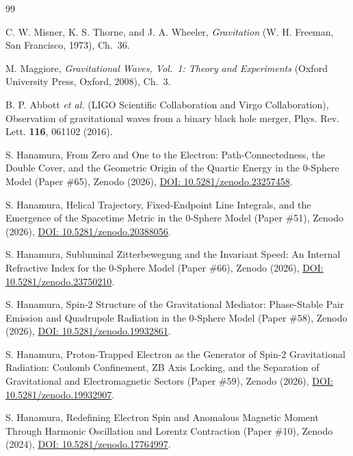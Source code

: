 \documentclass[%
 reprint, amsmath,amssymb, aps, prb, ]{revtex4-2}
\numberwithin{equation}{section}
\begin{document}
\begin{thebibliography}{99}

 C. W. Misner, K. S. Thorne, and J. A. Wheeler, \textit{Gravitation} (W. H. Freeman, San Francisco, 1973), Ch.~36.

 M. Maggiore, \textit{Gravitational Waves, Vol.~1: Theory and Experiments} (Oxford University Press, Oxford, 2008), Ch.~3.

 B. P. Abbott \textit{et al.} (LIGO Scientific Collaboration and Virgo Collaboration), Observation of gravitational waves from a binary black hole merger, Phys. Rev. Lett. \textbf{116}, 061102 (2016).

 S. Hanamura, From Zero and One to the Electron: Path-Connectedness, the Double Cover, and the Geometric Origin of the Quartic Energy in the 0-Sphere Model (Paper \#65), Zenodo (2026), \href{https://doi.org/10.5281/zenodo.23257458}{DOI: 10.5281/zenodo.23257458}.

 S. Hanamura, Helical Trajectory, Fixed-Endpoint Line Integrals, and the Emergence of the Spacetime Metric in the 0-Sphere Model (Paper \#51), Zenodo (2026), \href{https://doi.org/10.5281/zenodo.20388056}{DOI: 10.5281/zenodo.20388056}.

 S. Hanamura, Subluminal Zitterbewegung and the Invariant Speed: An Internal Refractive Index for the 0-Sphere Model (Paper \#66), Zenodo (2026), \href{https://doi.org/10.5281/zenodo.23750210}{DOI: 10.5281/zenodo.23750210}.

 S. Hanamura, Spin-2 Structure of the Gravitational Mediator: Phase-Stable Pair Emission and Quadrupole Radiation in the 0-Sphere Model (Paper \#58), Zenodo (2026), \href{https://doi.org/10.5281/zenodo.19932861}{DOI: 10.5281/zenodo.19932861}.

 S. Hanamura, Proton-Trapped Electron as the Generator of Spin-2 Gravitational Radiation: Coulomb Confinement, ZB Axis Locking, and the Separation of Gravitational and Electromagnetic Sectors (Paper \#59), Zenodo (2026), \href{https://doi.org/10.5281/zenodo.19932907}{DOI: 10.5281/zenodo.19932907}.

 S. Hanamura, Redefining Electron Spin and Anomalous Magnetic Moment Through Harmonic Oscillation and Lorentz Contraction (Paper \#10), Zenodo (2024), \href{https://doi.org/10.5281/zenodo.17764997}{DOI: 10.5281/zenodo.17764997}.


\end{thebibliography}
\end{document}
